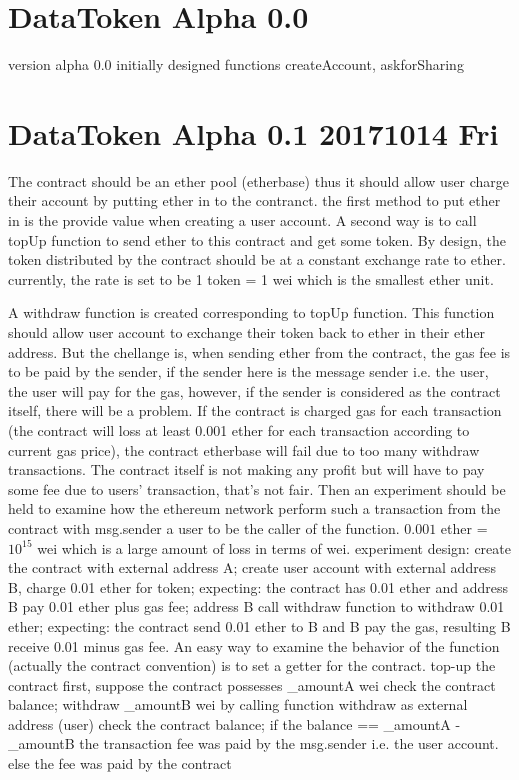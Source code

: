 \section{DataToken Alpha 0.0}
version alpha 0.0 
initially designed functions
createAccount, askforSharing

\section{DataToken Alpha 0.1 20171014 Fri}
The contract should be an ether pool (etherbase)
thus it should allow user charge their account by putting ether in to the contranct.
the first method to put ether in is the provide value when creating a user account.
A second way is to call topUp function to send ether to this contract and get some token.
By design, the token distributed by the contract should be at a constant exchange rate to ether.
currently, the rate is set to be 1 token = 1 wei which is the smallest ether unit.

A withdraw function is created corresponding to topUp function.
This function should allow user account to exchange their token back to ether in their ether address.
But the chellange is, when sending ether from the contract, the gas fee is to be paid by the sender, if the sender here is the message sender i.e. the user,
the user will pay for the gas, however, if the sender is considered as the contract itself, there will be a problem.
If the contract is charged gas for each transaction (the contract will loss at least 0.001 ether for each transaction according to current gas price),
the contract etherbase will fail due to too many withdraw transactions. The contract itself is not making any profit but will have to pay some fee due to users' transaction,
that's not fair.
Then an experiment should be held to examine how the ethereum network perform such a transaction from the contract with msg.sender a user to be the caller of the function.
$0.001$ ether = $10^15$  wei which is a large amount of loss in terms of wei.
    experiment design:
    create the contract with external address A;
    create user account with external address B, charge 0.01 ether for token;
        expecting: the contract has 0.01 ether and address B pay 0.01 ether plus gas fee;
    address B call withdraw function to withdraw 0.01 ether;
        expecting: the contract send 0.01 ether to B and B pay the gas, resulting B receive 0.01 minus gas fee.
    An easy way to examine the behavior of the function (actually the contract convention) is to set a getter for the contract.
    top-up the contract first, suppose the contract possesses \_amountA wei
        check the contract balance;
    withdraw \_amountB wei by calling function withdraw as external address (user)
        check the contract balance;
        if the balance == \_amountA - \_amountB
            the transaction fee was paid by the msg.sender i.e. the user account.
        else
            the fee was paid by the contract

